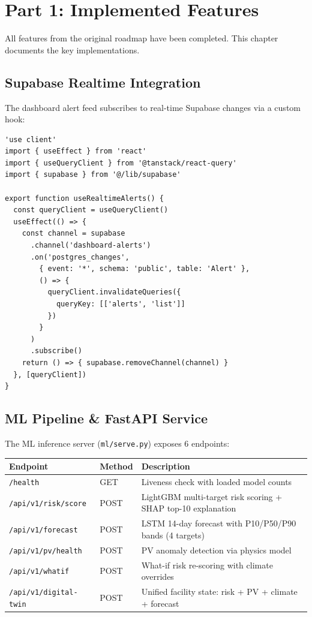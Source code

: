 \documentclass[12pt,a4paper]{report}
\begin{document}
\chapter{Part 1: Implemented Features}

All features from the original roadmap have been completed. This chapter documents the key implementations.

\section{Supabase Realtime Integration}

The dashboard alert feed subscribes to real-time Supabase changes via a custom hook:

\begin{lstlisting}[caption={Realtime alerts hook (hooks/useRealtimeAlerts.ts)}]
'use client'
import { useEffect } from 'react'
import { useQueryClient } from '@tanstack/react-query'
import { supabase } from '@/lib/supabase'

export function useRealtimeAlerts() {
  const queryClient = useQueryClient()
  useEffect(() => {
    const channel = supabase
      .channel('dashboard-alerts')
      .on('postgres_changes',
        { event: '*', schema: 'public', table: 'Alert' },
        () => {
          queryClient.invalidateQueries({
            queryKey: [['alerts', 'list']]
          })
        }
      )
      .subscribe()
    return () => { supabase.removeChannel(channel) }
  }, [queryClient])
}
\end{lstlisting}

\section{ML Pipeline \& FastAPI Service}

The ML inference server (\texttt{ml/serve.py}) exposes 6 endpoints:

\begin{tabularx}{\textwidth}{llX}
\toprule
\textbf{Endpoint} & \textbf{Method} & \textbf{Description} \\
\midrule
\texttt{/health}                & GET  & Liveness check with loaded model counts \\
\texttt{/api/v1/risk/score}     & POST & LightGBM multi-target risk scoring + SHAP top-10 explanation \\
\texttt{/api/v1/forecast}       & POST & LSTM 14-day forecast with P10/P50/P90 bands (4 targets) \\
\texttt{/api/v1/pv/health}      & POST & PV anomaly detection via physics model \\
\texttt{/api/v1/whatif}          & POST & What-if risk re-scoring with climate overrides \\
\texttt{/api/v1/digital-twin}   & POST & Unified facility state: risk + PV + climate + forecast \\
\bottomrule
\end{tabularx}
\end{document}
